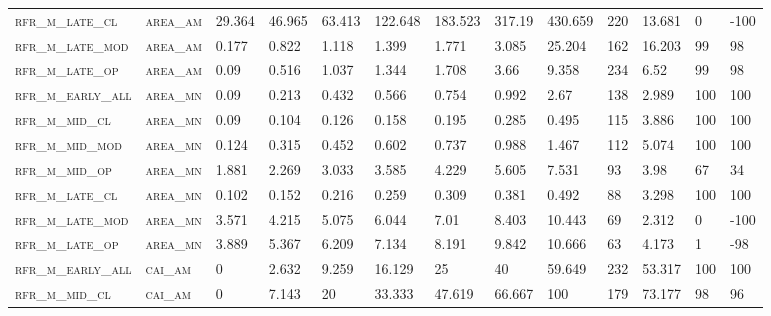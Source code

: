 \begin{landscape}
\begin{center}
\begin{footnotesize}
\begin{longtable}{lllllllllllll}
\textsc{rfr\_m\_late\_cl  } & \textsc{area\_am  }   & 29.364  & 46.965  & 63.413   & 122.648  & 183.523  & 317.19   & 430.659  & 220    & 13.681        & 0             & -100     \\
\textsc{rfr\_m\_late\_mod } & \textsc{area\_am  }   & 0.177   & 0.822   & 1.118    & 1.399    & 1.771    & 3.085    & 25.204   & 162    & 16.203        & 99            & 98       \\
\textsc{rfr\_m\_late\_op  } & \textsc{area\_am  }   & 0.09    & 0.516   & 1.037    & 1.344    & 1.708    & 3.66     & 9.358    & 234    & 6.52          & 99            & 98       \\
\textsc{rfr\_m\_early\_all} & \textsc{area\_mn  }   & 0.09    & 0.213   & 0.432    & 0.566    & 0.754    & 0.992    & 2.67     & 138    & 2.989         & 100           & 100      \\
\textsc{rfr\_m\_mid\_cl   } & \textsc{area\_mn  }   & 0.09    & 0.104   & 0.126    & 0.158    & 0.195    & 0.285    & 0.495    & 115    & 3.886         & 100           & 100      \\
\textsc{rfr\_m\_mid\_mod  } & \textsc{area\_mn  }   & 0.124   & 0.315   & 0.452    & 0.602    & 0.737    & 0.988    & 1.467    & 112    & 5.074         & 100           & 100      \\
\textsc{rfr\_m\_mid\_op   } & \textsc{area\_mn  }   & 1.881   & 2.269   & 3.033    & 3.585    & 4.229    & 5.605    & 7.531    & 93     & 3.98          & 67            & 34       \\
\textsc{rfr\_m\_late\_cl  } & \textsc{area\_mn  }   & 0.102   & 0.152   & 0.216    & 0.259    & 0.309    & 0.381    & 0.492    & 88     & 3.298         & 100           & 100      \\
\textsc{rfr\_m\_late\_mod } & \textsc{area\_mn  }   & 3.571   & 4.215   & 5.075    & 6.044    & 7.01     & 8.403    & 10.443   & 69     & 2.312         & 0             & -100     \\
\textsc{rfr\_m\_late\_op  } & \textsc{area\_mn  }   & 3.889   & 5.367   & 6.209    & 7.134    & 8.191    & 9.842    & 10.666   & 63     & 4.173         & 1             & -98      \\
\textsc{rfr\_m\_early\_all} & \textsc{cai\_am   }   & 0       & 2.632   & 9.259    & 16.129   & 25       & 40       & 59.649   & 232    & 53.317        & 100           & 100      \\
\textsc{rfr\_m\_mid\_cl   } & \textsc{cai\_am   }   & 0       & 7.143   & 20       & 33.333   & 47.619   & 66.667   & 100      & 179    & 73.177        & 98            & 96       \\

\end{longtable}
\end{footnotesize}
\end{center}
\end{landscape}
